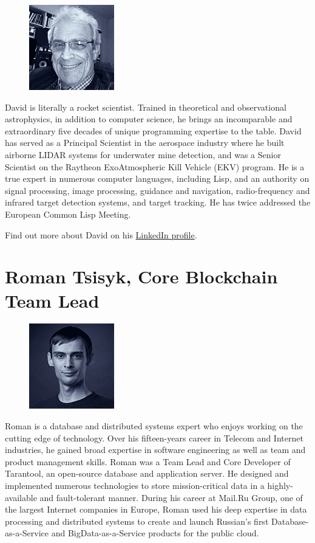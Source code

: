 \documentclass[8pt,fleqn,openany]{book}
\begin{document}
	{
		\setlength\intextsep{0pt}
		\begin{figure}
			\includegraphics{images/team/team-3.png}
		\end{figure}
		
		David is literally a rocket scientist. Trained in theoretical and observational astrophysics, in addition to computer science, he brings an incomparable and extraordinary five decades of unique programming expertise to the table. David has served as a Principal Scientist in the aerospace industry where he built airborne LIDAR systems for underwater mine detection, and was a Senior Scientist on the Raytheon ExoAtmospheric Kill Vehicle (EKV) program. He is a true expert in numerous computer languages, including Lisp, and an authority on signal processing, image processing, guidance and navigation, radio-frequency and infrared target detection systems, and target tracking. He has twice addressed the European Common Lisp Meeting. 
		
		Find out more about David on his \href{https://www.linkedin.com/in/david-mcclain-685669155/}{LinkedIn profile}.
		
		\section{Roman Tsisyk, Core Blockchain Team Lead}
		
		{
			\setlength\intextsep{0pt}
			\begin{figure}
				\includegraphics{images/team/team-4.png}
			\end{figure}
			
			Roman is a database and distributed systems expert who enjoys working on the cutting edge of technology. Over his fifteen-years career in Telecom and Internet industries, he gained broad expertise in software engineering as well as team and product management skills. Roman was a Team Lead and Core Developer of Tarantool, an open-source database and application server. He designed and implemented numerous technologies to store mission-critical data in a highly-available and fault-tolerant manner. During his career at Mail.Ru Group, one of the largest Internet companies in Europe, Roman used his deep expertise in data processing and distributed systems to create and launch Russian’s first Database-as-a-Service and BigData-as-a-Service products for the public cloud. 
			
}}
\end{document}
